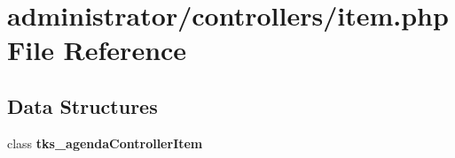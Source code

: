 \section{administrator/controllers/item.php File Reference}
\label{administrator_2controllers_2item_8php}
\subsection*{Data Structures}
\begin{DoxyCompactItemize}
\item 
class \textbf{ tks\+\_\+agenda\+Controller\+Item}
\end{DoxyCompactItemize}

